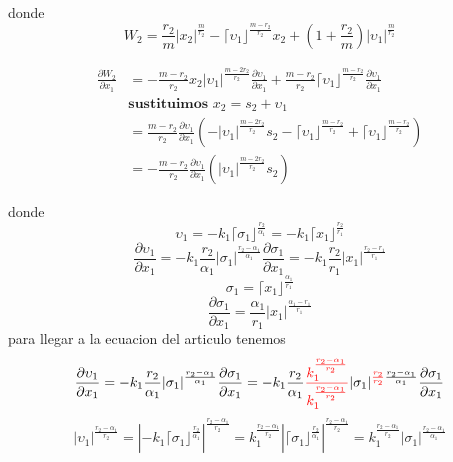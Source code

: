    donde 
   \begin{equation}
        W_2 = \frac{r_2}{m} |x_2|^{\frac{m}{r_2}} - \lceil \upsilon_1 \rfloor^{\frac{m-r_2}{r_2}} x_2 + (1+\frac{r_2}{m})|\upsilon_1|^{\frac{m}{r_2}}
   \end{equation} 

   
   \begin{equation}
        \begin{split}
             \frac{\partial W_2}{\partial x_1}&=-\frac{m-r_2}{r_2} x_2 |\upsilon_1|^{\frac{m-2r_2}{r_2}} \frac{\partial \upsilon_1}{\partial x_1}+\frac{m-r_2}{r_2}\lceil \upsilon_1 \rfloor^{\frac{m-r_2}{r_2}}\frac{\partial \upsilon_1}{\partial x_1}\\
             &\textbf{sustituimos $x_2=s_2+\upsilon_1$} \\
             &=\frac{m-r_2}{r_2} \frac{\partial \upsilon_1}{\partial x_1} \left( -|\upsilon_1|^{\frac{m-2r_2}{r_2}}s_2 -\lceil \upsilon_1 \rfloor^{\frac{m-r_2}{r_2}} +\lceil \upsilon_1 \rfloor^{\frac{m-r_2}{r_2}} \right)\\
             &=-\frac{m-r_2}{r_2} \frac{\partial \upsilon_1}{\partial x_1} \left( |\upsilon_1|^{\frac{m-2r_2}{r_2}}s_2 \right)
        \end{split}
   \end{equation}

   donde
   \begin{equation}
       \upsilon_1=-k_1\lceil \sigma_1 \rfloor^{\frac{r_2}{\alpha_1}}=-k_1\lceil x_1 \rfloor^{\frac{r_2}{r_1}}
   \end{equation}
   \begin{equation}
       \frac{\partial \upsilon_1}{\partial x_1}= -k_1 \frac{r_2}{\alpha_1} |\sigma_1|^{\frac{r_2-\alpha_1}{\alpha_1}} \frac{\partial \sigma_1}{\partial x_1}  = -k_1 \frac{r_2}{r_1}|x_1|^{\frac{r_2-r_1}{r_1}}
   \end{equation}
   \begin{equation}
     \sigma_1=\lceil x_1 \rfloor^{\frac{\alpha_1}{r_1}}
   \end{equation}
   \begin{equation}
     \frac{\partial \sigma_1}{\partial x_1}=\frac{\alpha_1}{r_1} |x_1|^{\frac{\alpha_1-r_1}{r_1}}
   \end{equation}
   para llegar a la ecuacion del articulo tenemos
   \begin{equation}
     \frac{\partial \upsilon_1}{\partial x_1}= -k_1 \frac{r_2}{\alpha_1} |\sigma_1|^{\frac{r_2-\alpha_1}{\alpha_1}} \frac{\partial \sigma_1}{\partial x_1}= -k_1 \frac{r_2}{\alpha_1} \textcolor{red}{\frac{k_1^{\frac{r_2-\alpha_1}{r_2}}}{k_1^{\frac{r_2-\alpha_1}{r_2}}}}  |\sigma_1 |^{\textcolor{red}{\frac{r_2}{r_2}} \frac{r_2-\alpha_1}{\alpha_1}} \frac{\partial \sigma_1}{\partial x_1}
 \end{equation}
 \begin{equation}
   |\upsilon_1|^{\frac{r_2-\alpha_1}{r_2}}=|-k_1\lceil \sigma_1 \rfloor^{\frac{r_2}{\alpha_1}}|^{\frac{r_2-\alpha_1}{r_2}}=k_1^{\frac{r_2-\alpha_1}{r_2}}|\lceil \sigma_1 \rfloor^{\frac{r_2}{\alpha_1}}|^{\frac{r_2-\alpha_1}{r_2}}=k_1^{\frac{r_2-\alpha_1}{r_2}}|\sigma_1|^{\frac{r_2-\alpha_1}{\alpha_1}}
 \end{equation}
 

